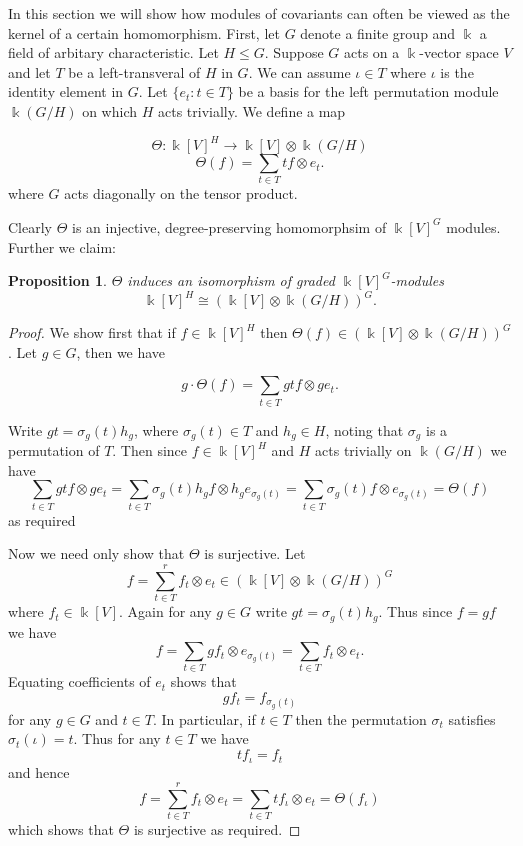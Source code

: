 \documentclass[a4paper]{amsart}
\newcommand{\kk}{\Bbbk}
\newtheorem{prop}[Lemma]{Proposition}
\newtheorem*{Corollary of Conjecture}{Corollary of Conjecture}
\theoremstyle{definition}
\theoremstyle{remark}
\theoremstyle{Acknowledgments}
\begin{document}
In this section we will show how modules of covariants can often be viewed as the kernel of a certain homomorphism. First, let $G$ denote a finite group and $\kk$ a field of arbitary characteristic. Let $H \leq G$. Suppose $G$ acts on a $\kk$-vector space $V$ and let $T$ be a left-transveral of $H$ in $G$. We can assume $\iota \in T$ where $\iota$ is the identity element in $G$. Let $\{e_t: t \in T\}$ be a basis for the left permutation module $\kk(G/H)$ on which $H$ acts trivially. We define a map

\[\Theta: \kk[V]^H \rightarrow \kk[V] \otimes \kk(G/H)\]
\[\Theta(f) = \sum_{t \in T} tf \otimes e_t.\]
where $G$ acts diagonally on the tensor product.

Clearly $\Theta$ is an injective, degree-preserving homomorphsim of  $\kk[V]^G$ modules. Further we claim:
\begin{prop} $\Theta$ induces an isomorphism  of graded $\kk[V]^G$-modules $$\kk[V]^H \cong (\kk[V] \otimes \kk(G/H))^G.$$
\end{prop}

\begin{proof} We show first that if $f \in \kk[V]^H$ then $\Theta(f) \in (\kk[V] \otimes \kk(G/H))^G$. Let $g \in G$, then we have

$$g \cdot \Theta(f) = \sum_{t \in T} gt f \otimes ge_t.$$

Write $gt = \sigma_g(t) h_g$, where $\sigma_g(t) \in T$ and $h_g \in H$, noting that $\sigma_g$ is a permutation of $T$. Then since $f \in \kk[V]^H$ and $H$ acts trivially on $\kk(G/H)$ we have
\[ \sum_{t \in T} gt f \otimes ge_t = \sum_{t \in T} \sigma_g(t) h_g f \otimes h_g e_{\sigma_g(t)} = \sum_{t \in T} \sigma_g(t) f \otimes e_{\sigma_g(t)} = \Theta(f)\] as required

 Now we need only show that $\Theta$ is surjective. Let $$f = \sum_{t \in T}^r f_t \otimes e_t \in (\kk[V]\otimes \kk(G/H))^G$$ where $f_t \in \kk[V]$. Again for any $g \in G$ write $gt = \sigma_g(t)h_g.$ Thus since $f = gf$ we have
$$f = \sum_{t \in T} gf_t \otimes e_{\sigma_g(t)}= \sum_{t \in T} f_t \otimes e_t.$$
Equating coefficients of $e_t$ shows that
\[gf_t = f_{\sigma_g(t)}\] for any $g \in G$ and $t \in T$. In particular, if $t \in T$ then the permutation $\sigma_t$ satisfies $\sigma_t(\iota) = t$. Thus for any $t \in T$ we have
\[t f_{\iota} = f_t\] and hence 
\[f =  \sum_{t \in T}^r f_t \otimes e_t = \sum_{t \in T} tf_{\iota} \otimes e_t = \Theta(f_{\iota})\] which shows that $\Theta$ is surjective as required.
\end{proof}
\end{document}
